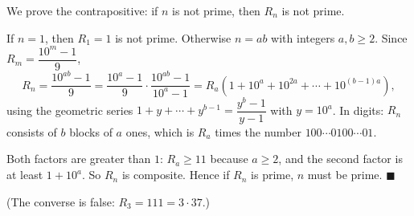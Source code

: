 We prove the contrapositive: if $n$ is not prime, then $R_n$ is not prime.

If $n=1$, then $R_1=1$ is not prime. Otherwise $n=ab$ with integers $a,b\ge2$. Since $R_m=\dfrac{10^m-1}{9}$,
\[R_n=\dfrac{10^{ab}-1}{9}=\dfrac{10^a-1}{9}\cdot\dfrac{10^{ab}-1}{10^a-1}=R_a\left(1+10^a+10^{2a}+\cdots+10^{(b-1)a}\right),\]
using the geometric series $1+y+\cdots+y^{b-1}=\dfrac{y^b-1}{y-1}$ with $y=10^a$. In digits: $R_n$ consists of $b$ blocks of $a$ ones, which is $R_a$ times the number $100\cdots0100\cdots01$.

Both factors are greater than $1$: $R_a\ge11$ because $a\ge2$, and the second factor is at least $1+10^a$. So $R_n$ is composite. Hence if $R_n$ is prime, $n$ must be prime. $\blacksquare$

(The converse is false: $R_3=111=3\cdot37$.)
